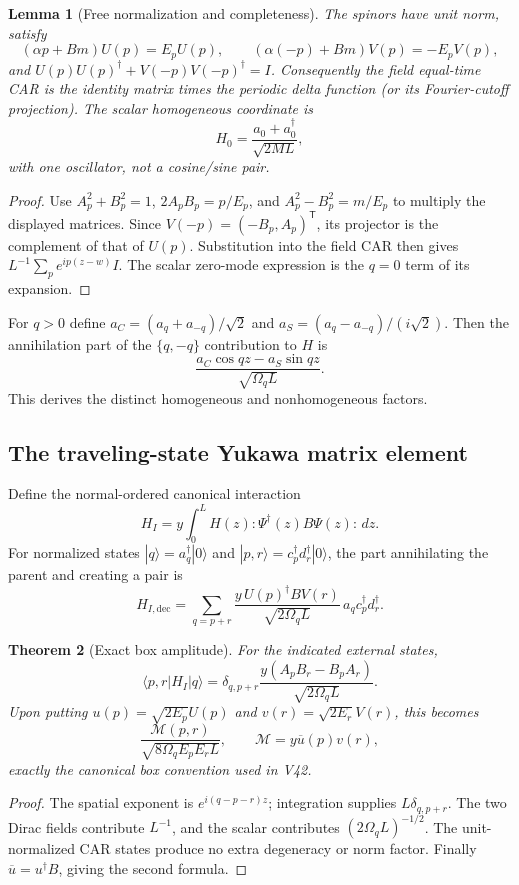 \documentclass[11pt]{article}
\newtheorem{theorem}{Theorem}[section]
\newtheorem{lemma}[theorem]{Lemma}
\theoremstyle{remark}
\begin{document}
\begin{lemma}[Free normalization and completeness]
\label{lem:v20v43-free}
The spinors have unit norm, satisfy
\[
 (\alpha p+Bm)U(p)=E_pU(p),\qquad
 (\alpha(-p)+Bm)V(p)=-E_pV(p),
\]
and \(U(p)U(p)^\dagger+V(-p)V(-p)^\dagger=I\).
Consequently the field equal-time CAR is the identity matrix times
the periodic delta function (or its Fourier-cutoff projection).
The scalar homogeneous coordinate is
\[
 H_0=\frac{a_0+a_0^\dagger}{\sqrt{2ML}},
\]
with one oscillator, not a cosine/sine pair.
\end{lemma}
\begin{proof}
Use \(A_p^2+B_p^2=1\), \(2A_pB_p=p/E_p\),
and \(A_p^2-B_p^2=m/E_p\) to multiply the displayed matrices.
Since \(V(-p)=(-B_p,A_p)^{\mathsf T}\), its projector is the complement
of that of \(U(p)\).  Substitution into the field CAR then gives
\(L^{-1}\sum_p e^{ip(z-w)}I\).  The scalar zero-mode expression is
the \(q=0\) term of its expansion.
\end{proof}

For \(q>0\) define \(a_C=(a_q+a_{-q})/\sqrt2\) and
\(a_S=(a_q-a_{-q})/(i\sqrt2)\).  Then the annihilation part of the
\(\{q,-q\}\) contribution to \(H\) is
\[
 \frac{a_C\cos qz-a_S\sin qz}{\sqrt{\Omega_q L}}.
\]
This derives the distinct homogeneous and nonhomogeneous factors.

\subsection{The traveling-state Yukawa matrix element}

Define the normal-ordered canonical interaction
\[
 H_I=y\int_0^L H(z):\Psi^\dagger(z)B\Psi(z):\,dz.
\]
For normalized states
\(|q\rangle=a_q^\dagger|0\rangle\) and
\(|p,r\rangle=c_p^\dagger d_r^\dagger|0\rangle\),
the part annihilating the parent and creating a pair is
\[
 H_{I,\mathrm{dec}}=
 \sum_{q=p+r}\frac{y\,U(p)^\dagger B V(r)}
 {\sqrt{2\Omega_q L}}\,a_qc_p^\dagger d_r^\dagger.
\]

\begin{theorem}[Exact box amplitude]
\label{thm:v20v43-vertex}
For the indicated external states,
\[
 \langle p,r|H_I|q\rangle
 =\delta_{q,p+r}\frac{y(A_pB_r-B_pA_r)}{\sqrt{2\Omega_q L}}.
\]
Upon putting \(u(p)=\sqrt{2E_p}U(p)\) and
\(v(r)=\sqrt{2E_r}V(r)\), this becomes
\[
 \frac{\mathcal M(p,r)}{\sqrt{8\Omega_qE_pE_rL}},
 \qquad \mathcal M=y\overline u(p)v(r),
\]
exactly the canonical box convention used in V42.
\end{theorem}
\begin{proof}
The spatial exponent is \(e^{i(q-p-r)z}\); integration supplies
\(L\delta_{q,p+r}\).  The two Dirac fields contribute \(L^{-1}\),
and the scalar contributes \((2\Omega_q L)^{-1/2}\).
The unit-normalized CAR states produce no extra degeneracy or norm
factor.  Finally \(\overline u=u^\dagger B\), giving the second formula.
\end{proof}
\end{document}
